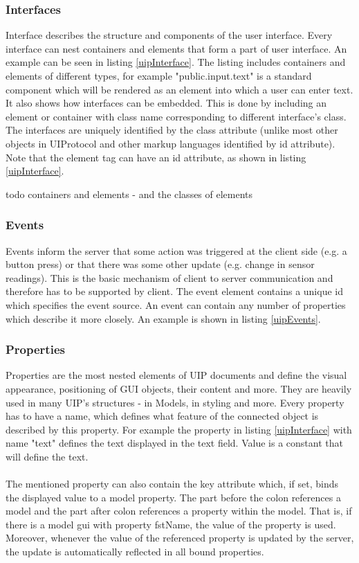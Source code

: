 \subsubsection{Interfaces}
Interface describes the structure and components of the user interface. Every interface can nest containers and elements that form a part of user interface. An example can be seen in listing \ref{uipInterface}. The listing includes containers and elements of different types, for example "public.input.text" is a standard component which will be rendered as an element into which a user can enter text. It also shows how interfaces can be embedded. This is done by including an element or container with class name corresponding to different interface's class.\\The interfaces are uniquely identified by the class attribute (unlike most other objects in UIProtocol and other markup languages identified by id attribute). Note that the element tag can have an id attribute, as shown in listing \ref{uipInterface}.


todo containers and elements - and the classes of elements

\subsubsection{Events}
Events inform the server that some action was triggered at the client side (e.g. a button press) or that there was some other update (e.g. change in sensor readings). This is the basic mechanism of client to server communication and therefore has to be supported by client. The event element contains a unique id which specifies the event source. An event can contain any number of properties which describe it more closely. An example is shown in listing \ref{uipEvents}.


\subsubsection{Properties}
\label{subsec:props}
Properties are the most nested elements of UIP documents and define the visual appearance, positioning of GUI objects, their content and more. They are heavily used in many UIP's structures - in Models, in styling and more. Every property has to have a name, which defines what feature of the connected object is described by this property. For example the property in listing \ref{uipInterface} with name "text" defines the text displayed in the text field. Value is a constant that will define the text.\\\\
The mentioned property can also contain the key attribute which, if set, binds the displayed value to a model property. The part before the colon references a model and the part after colon references a property within the model. That is, if there is a model gui with property fstName, the value of the property is used. Moreover, whenever the value of the referenced property is updated by the server, the update is automatically reflected in all bound properties.

